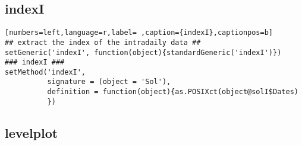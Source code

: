 \subsection{indexI}
\label{sec:org40727aa}
\label{subsec:indexi}
\begin{lstlisting}[numbers=left,language=r,label= ,caption={indexI},captionpos=b]
## extract the index of the intradaily data ##
setGeneric('indexI', function(object){standardGeneric('indexI')})
### indexI ###
setMethod('indexI',
          signature = (object = 'Sol'),
          definition = function(object){as.POSIXct(object@solI$Dates)
          })
\end{lstlisting}
\subsection{levelplot}
\label{sec:orgbe5bade}
\label{subsec:levelplot}

